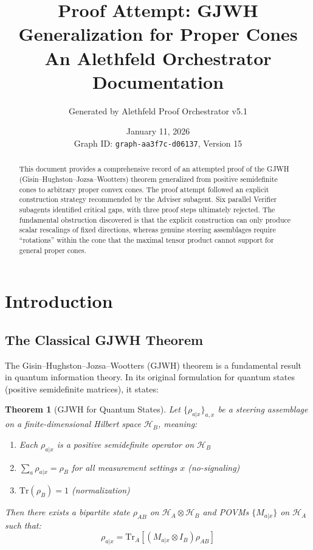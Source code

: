 \documentclass[11pt,a4paper]{article}
\title{Proof Attempt: GJWH Generalization for Proper Cones\\[0.5em]
\large An Alethfeld Orchestrator Documentation}
\author{Generated by Alethfeld Proof Orchestrator v5.1}
\date{January 11, 2026\\Graph ID: \texttt{graph-aa3f7c-d06137}, Version 15}
\newtheorem{theorem}{Theorem}[section]
\theoremstyle{definition}
\begin{document}
\maketitle

\begin{abstract}
This document provides a comprehensive record of an attempted proof of the GJWH (Gisin--Hughston--Jozsa--Wootters) theorem generalized from positive semidefinite cones to arbitrary proper convex cones. The proof attempt followed an explicit construction strategy recommended by the Adviser subagent. Six parallel Verifier subagents identified critical gaps, with three proof steps ultimately rejected. The fundamental obstruction discovered is that the explicit construction can only produce scalar rescalings of fixed directions, whereas genuine steering assemblages require ``rotations'' within the cone that the maximal tensor product cannot support for general proper cones.
\end{abstract}

\tableofcontents
\newpage

\section{Introduction}

\subsection{The Classical GJWH Theorem}

The Gisin--Hughston--Jozsa--Wootters (GJWH) theorem is a fundamental result in quantum information theory. In its original formulation for quantum states (positive semidefinite matrices), it states:

\begin{theorem}[GJWH for Quantum States]
Let $\{\rho_{a|x}\}_{a,x}$ be a steering assemblage on a finite-dimensional Hilbert space $\mathcal{H}_B$, meaning:
\begin{enumerate}[label=(\roman*)]
    \item Each $\rho_{a|x}$ is a positive semidefinite operator on $\mathcal{H}_B$
    \item $\sum_a \rho_{a|x} = \rho_B$ for all measurement settings $x$ (no-signaling)
    \item $\mathrm{Tr}(\rho_B) = 1$ (normalization)
\end{enumerate}
Then there exists a bipartite state $\rho_{AB}$ on $\mathcal{H}_A \otimes \mathcal{H}_B$ and POVMs $\{M_{a|x}\}$ on $\mathcal{H}_A$ such that:
\[
\rho_{a|x} = \mathrm{Tr}_A\left[(M_{a|x} \otimes I_B)\rho_{AB}\right]
\]
\end{theorem}
\end{document}
